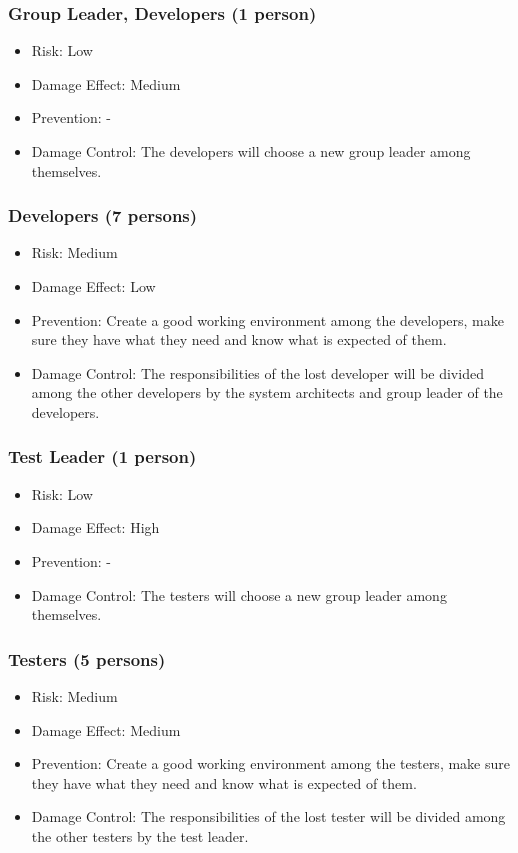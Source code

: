 \documentclass[a4paper]{article}
\begin{document}
\subsubsection{Group Leader, Developers (1 person)}
\begin{itemize}
\item Risk: Low
\item Damage Effect: Medium
\item Prevention: -
\item Damage Control: The developers will choose a new group leader among themselves.
\end{itemize}

\subsubsection{Developers (7 persons)}
\begin{itemize}
\item Risk: Medium
\item Damage Effect: Low
\item Prevention: Create a good working environment among the developers, make sure they have what they need and know what is expected of them.
\item Damage Control: The responsibilities of the lost developer will be divided among the other developers by the system architects and group leader of the developers.
\end{itemize}

\subsubsection{Test Leader (1 person)}
\begin{itemize}
\item Risk: Low
\item Damage Effect: High
\item Prevention: -
\item Damage Control: The testers will choose a new group leader among themselves.
\end{itemize}

\subsubsection{Testers (5 persons)}
\begin{itemize}
\item Risk: Medium
\item Damage Effect: Medium
\item Prevention: Create a good working environment among the testers, make sure they have what they need and know what is expected of them.
\item Damage Control: The responsibilities of the lost tester will be divided among the other testers by the test leader.
\end{itemize}
\end{document}
